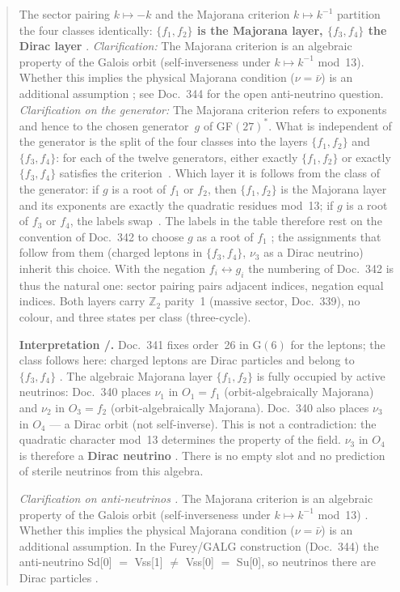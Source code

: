 \begin{abstract}
The sector pairing $k \mapsto -k$ and the Majorana criterion $k \mapsto k^{-1}$
partition the four classes identically: \textbf{$\{f_1,f_2\}$ is the Majorana
layer, $\{f_3,f_4\}$ the Dirac layer} \BM. \textit{Clarification:} The Majorana
criterion is an algebraic property of the Galois orbit (self-inverseness under
$k\mapsto k^{-1}$ mod~13). Whether this implies the physical Majorana condition
($\nu=\bar{\nu}$) is an additional assumption \SM; see Doc.~344 for the open
anti-neutrino question.
\textit{Clarification on the generator:} The Majorana criterion refers to
exponents and hence to the chosen generator~$g$ of GF$(27)^*$. What is
independent of the generator is the split of the four classes into the layers
$\{f_1,f_2\}$ and $\{f_3,f_4\}$: for each of the twelve generators, either
exactly $\{f_1,f_2\}$ or exactly $\{f_3,f_4\}$ satisfies the criterion
\BM\,\LM. Which layer it is follows from the class of the generator: if $g$ is
a root of $f_1$ or $f_2$, then $\{f_1,f_2\}$ is the Majorana layer and its
exponents are exactly the quadratic residues mod~13; if $g$ is a root of $f_3$
or $f_4$, the labels swap \BM\,\LM. The labels in the table therefore rest on
the convention of Doc.~342 to choose $g$ as a root of $f_1$ \SetzM; the
assignments that follow from them (charged leptons in $\{f_3,f_4\}$, $\nu_3$ as
a Dirac neutrino) inherit this choice. With the negation $f_i \leftrightarrow g_i$
the numbering of Doc.~342 is thus the natural one: sector pairing pairs adjacent
indices, negation equal indices. Both layers carry $\mathbb{Z}_2$
parity~1 (massive sector, Doc.~339), no colour, and three states per class
(three-cycle).

\textbf{Interpretation \BM/\SM.} Doc.~341 fixes order~26 in G$(6)$ for the
leptons; the class follows here: charged leptons are Dirac particles and belong
to $\{f_3,f_4\}$ \BM. The algebraic Majorana layer $\{f_1,f_2\}$ is fully
occupied by active neutrinos: Doc.~340 places $\nu_1$ in $O_1=f_1$
(orbit-algebraically Majorana) and $\nu_2$ in $O_3=f_2$ (orbit-algebraically
Majorana). Doc.~340 also places $\nu_3$ in $O_4$ --- a Dirac orbit (not
self-inverse). This is not a contradiction: the quadratic character mod~13
determines the property of the field. $\nu_3$ in $O_4$ is therefore a
\textbf{Dirac neutrino} \BM. There is no empty slot and no prediction of
sterile neutrinos from this algebra.

\textit{Clarification on anti-neutrinos \SM.} The Majorana criterion
is an algebraic property of the Galois orbit (self-inverseness under
$k\mapsto k^{-1}$ mod~13) \BM. Whether this implies the physical Majorana
condition ($\nu=\bar{\nu}$) is an additional assumption. In the Furey/GALG
construction (Doc.~344) the anti-neutrino Sd[0] $=$ Vss[1] $\neq$
Vss[0] $=$ Su[0], so neutrinos there are Dirac particles \SM.


\end{abstract}

